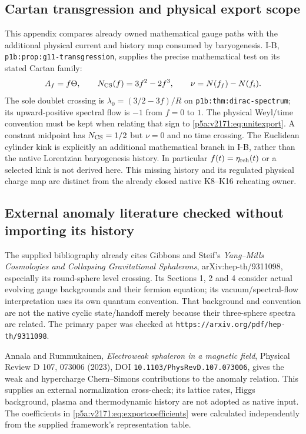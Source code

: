 \documentclass[11pt,a4paper]{article}
\begin{document}
\subsection{Cartan transgression and physical export scope}
\label{p5a:v2171:app:gaugehistoryscope}
This appendix compares already owned mathematical gauge paths with the
additional physical current and history map consumed by baryogenesis.
I-B, \texttt{p1b:prop:g11-transgression}, supplies the precise mathematical
test on its stated Cartan family:
\begin{equation}
 A_f=f\Theta,\qquad N_{\rm CS}(f)=3f^2-2f^3,\qquad
 \nu=N(f_f)-N(f_i).
 \label{p5a:v2171:eq:csflux}
\end{equation}
The sole doublet crossing is $\lambda_0=(3/2-3f)/R$ on
\texttt{p1b:thm:dirac-spectrum}; its upward-positive spectral flow is $-1$
from $f=0$ to $1$. The physical Weyl/time convention must be kept when
relating that sign to \eqref{p5a:v2171:eq:unitexport}. A constant midpoint has
$N_{\rm CS}=1/2$ but $\nu=0$ and no time crossing. The Euclidean cylinder
kink is explicitly an additional mathematical branch in I-B, rather than
the native Lorentzian baryogenesis history. In particular
$f(t)=\eta_{\rm reh}(t)$ or a selected kink is not derived here.
This missing history and its regulated physical charge map are distinct
from the already closed native K8--K16 reheating owner.

\subsection{External anomaly literature checked without importing its history}
\label{p5a:v2171:app:externalanomaly}
The supplied bibliography already cites Gibbons and Steif's
\emph{Yang--Mills Cosmologies and Collapsing Gravitational Sphalerons},
arXiv:hep-th/9311098, especially its round-sphere level crossing.
Its Sections 1, 2 and 4 consider actual evolving gauge backgrounds and
their fermion equation; its vacuum/spectral-flow interpretation uses its
own quantum convention. That background and convention are not the native
cyclic state/handoff merely because their three-sphere spectra are related.
The primary paper was checked at
\texttt{https://arxiv.org/pdf/hep-th/9311098}.

Annala and Rummukainen, \emph{Electroweak sphaleron in a magnetic field},
Physical Review D 107, 073006 (2023), DOI
\texttt{10.1103/PhysRevD.107.073006}, gives the weak and hypercharge
Chern--Simons contributions to the anomaly relation. This supplies an
external normalization cross-check; its lattice rates, Higgs background,
plasma and thermodynamic history are not adopted as native input.
The coefficients in \eqref{p5a:v2171:eq:exportcoefficients} were calculated
independently from the supplied framework's representation table.
\end{document}
